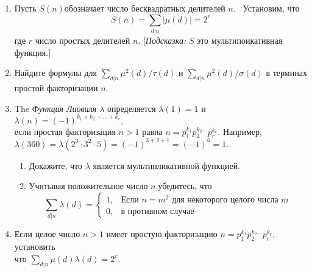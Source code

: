 \documentclass[11pt]{article}
\begin{document}
\begin{enumerate}
\item Пусть $S(n)$обозначает число бесквадратных делителей $n$.~ Установим, что\\
\[
S(n)=\sum_{d|n}|\mu(d)|=2^r
\]
где $r$ число простых делителей $n$. [{\itshape Подсказка:} $S$ это мультипоикативная функция.] 
\item Найдите формулы для 
$\sum_{d|n}\mu^2(d)/\tau(d)$ и
$\sum_{d|n}\mu^2(d)/\sigma(d)$ в терминах простой факторизации  $n$.
\item The {\it Функция Лиовиля $\lambda$} определяется $\lambda(1)=1$ и $\lambda(n)=(-1)^{k_1+k_2+\dots+k_r},$\\
если простая факторизация $n>1$ равна $n=p_1^{k_1}p_2^{k_2\dots}p_r^{k_r}.$ Например,\\
$\lambda(360)=\lambda(2^3 \cdot 3^2 \cdot5)=(-1)^{3+2+1}=(-1)^6=1.$
\begin{enumerate}
\item Докажите, что $\lambda$ является мультипликативной функцией.
\item Учитывая положительное число $n$,убедитесь, что\\
\[\sum_{d|n}\lambda(d)=\begin{cases}
1,&\text{Если $n=m^2$ для некоторого целого числа $m$}\\
0,&\text{в противном случае}
\end{cases} \]
\end{enumerate}
\item Если целое число $n>1$ имеет простую факторизацию $n=p_1^{k_1}p_2^{k_2\dots}p_r^{k_r}$, установить\\
что $\sum_{d|n}\mu(d)\lambda(d)=2^r.$
	
	
	
	
	
\end{enumerate}	
\end{document}
